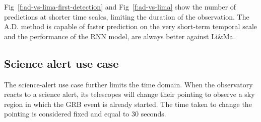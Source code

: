 Fig~\ref{f:ad-vs-lima-first-detection} and Fig~\ref{f:ad-vs-lima} show the number of predictions at shorter time scales, limiting the duration of the observation. 
The A.D. method is capable of faster prediction on the very short-term temporal scale and the performance of the RNN model, are always better against Li\&Ma. 
 











\subsection{Science alert use case}
\label{s:Science-Alert-Results}
The science-alert use case further limits the time domain. When the observatory reacts to a science alert, its telescopes will change their pointing to observe a sky region in which the GRB event is already started. The time taken to change the pointing is considered fixed and equal to 30 seconds.  



